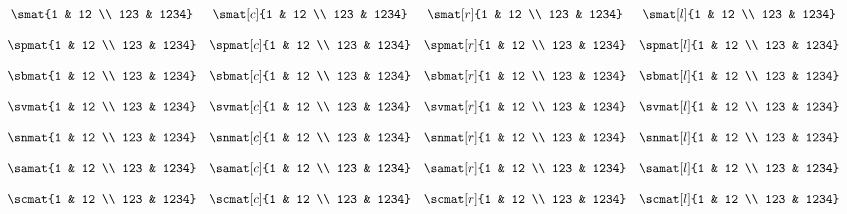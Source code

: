 \documentclass{unittest}
\begin{document}
\(\begin{array}{ccccc}
\\\\%
&	\smat{1 & 12 \\ 123 & 1234}
&	\smat[c]{1 & 12 \\ 123 & 1234}
&	\smat[r]{1 & 12 \\ 123 & 1234}
&	\smat[l]{1 & 12 \\ 123 & 1234}
\\\\%
&	\spmat{1 & 12 \\ 123 & 1234}
&	\spmat[c]{1 & 12 \\ 123 & 1234}
&	\spmat[r]{1 & 12 \\ 123 & 1234}
&	\spmat[l]{1 & 12 \\ 123 & 1234}
\\\\%
&	\sbmat{1 & 12 \\ 123 & 1234}
&	\sbmat[c]{1 & 12 \\ 123 & 1234}
&	\sbmat[r]{1 & 12 \\ 123 & 1234}
&	\sbmat[l]{1 & 12 \\ 123 & 1234}
\\\\%
&	\svmat{1 & 12 \\ 123 & 1234}
&	\svmat[c]{1 & 12 \\ 123 & 1234}
&	\svmat[r]{1 & 12 \\ 123 & 1234}
&	\svmat[l]{1 & 12 \\ 123 & 1234}
\\\\%
&	\snmat{1 & 12 \\ 123 & 1234}
&	\snmat[c]{1 & 12 \\ 123 & 1234}
&	\snmat[r]{1 & 12 \\ 123 & 1234}
&	\snmat[l]{1 & 12 \\ 123 & 1234}
\\\\%
&	\samat{1 & 12 \\ 123 & 1234}
&	\samat[c]{1 & 12 \\ 123 & 1234}
&	\samat[r]{1 & 12 \\ 123 & 1234}
&	\samat[l]{1 & 12 \\ 123 & 1234}
\\\\%
&	\scmat{1 & 12 \\ 123 & 1234}
&	\scmat[c]{1 & 12 \\ 123 & 1234}
&	\scmat[r]{1 & 12 \\ 123 & 1234}
&	\scmat[l]{1 & 12 \\ 123 & 1234}
\\\\%
\end{array}\)
\end{document}

